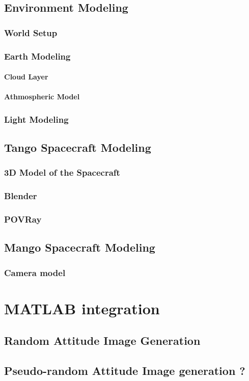 \subsection{Environment Modeling}

\subsubsection{World Setup}

\subsubsection{Earth Modeling}

\paragraph{Cloud Layer}

\paragraph{Athmospheric Model}

\subsubsection{Light Modeling}

\subsection{Tango Spacecraft Modeling}

\subsubsection{3D Model of the Spacecraft}

\subsubsection{Blender}

\subsubsection{POVRay}

\subsection{Mango Spacecraft Modeling}

\subsubsection{Camera model}

\section{MATLAB integration}

\subsection{Random Attitude Image Generation}

\subsection{Pseudo-random Attitude Image generation ?}
